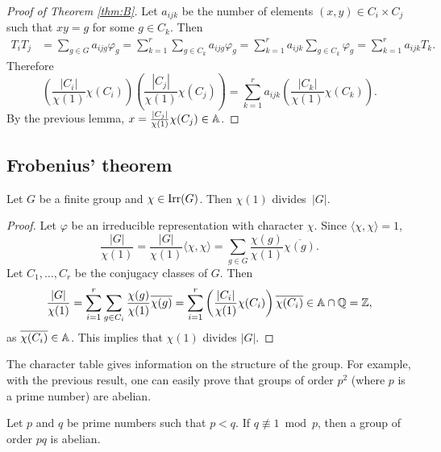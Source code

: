 \begin{proof}[Proof of Theorem \ref{thm:B}]
    Let $a_{ijk}$ be the number of elements 
    $(x,y)\in C_i\times C_j$ such that $xy=g$ for some $g\in C_k$. 
    Then 
    \begin{align*}
        T_iT_j & 
        =\sum_{g\in G}a_{ijg}\varphi_g
        =\sum_{k=1}^r\sum_{g\in C_k}a_{ijg}\varphi_g
        =\sum_{k=1}^ra_{ijk}\sum_{g\in C_k}\varphi_g
        =\sum_{k=1}^ra_{ijk}T_k.
    \end{align*}
    Therefore 
    \begin{equation}
        \label{eq:omega}
    \left(\frac{|C_i|}{\chi(1)}\chi(C_i)\right)
    \left(\frac{|C_j|}{\chi(1)}\chi(C_j)\right)
    =\sum_{k=1}^r a_{ijk}\left(\frac{|C_k|}{\chi(1)}\chi(C_k)\right).
    \end{equation}
    By the previous lemma, $x=\frac{|C_j|}{\chi(1)}\chi(C_j)\in\mathbb{A}$.
\end{proof}

\subsection{Frobenius' theorem}
\label{degree}

\begin{theorem}[Frobenius]
\label{thm:Frobenius_chi(1)}
    Let $G$ be a finite group and $\chi\in\operatorname{Irr}(G)$. 
    Then $\chi(1)$ divides~$|G|$. 
\end{theorem}

\begin{proof}
    Let $\varphi$ be an irreducible representation with character $\chi$. 
    Since $\langle\chi,\chi\rangle=1$, 
    \[
    \frac{|G|}{\chi(1)}=\frac{|G|}{\chi(1)}\langle\chi,\chi\rangle
    =\sum_{g\in G}\frac{\chi(g)}{\chi(1)}\overline{\chi(g)}.
    \]
    Let $C_1,\dots,C_r$ be the conjugacy classes of $G$. 
    Then 
    \[
        \frac{|G|}{\chi(1)}
        =\sum_{i=1}^r\sum_{g\in C_i}\frac{\chi(g)}{\chi(1)}\overline{\chi(g)}
        =\sum_{i=1}^r\left(\frac{|C_i|}{\chi(1)}\chi(C_i)\right)\overline{\chi(C_i)}\in\mathbb{A}\cap\mathbb{Q}=\mathbb{Z},
    \]
    as $\overline{\chi(C_i)}\in\mathbb{A}$. This implies that $\chi(1)$ divides $|G|$. 
\end{proof}

The character table gives information on the structure of the group. For example,
with the previous result, one can easily prove that
groups of order $p^2$ (where $p$ is a prime number) are abelian. 

\begin{exercise}
    Let $p$ and $q$ be prime numbers such that $p<q$.
    If $q\not\equiv1\bmod p$, then a group of order $pq$ is abelian. 
\end{exercise}

